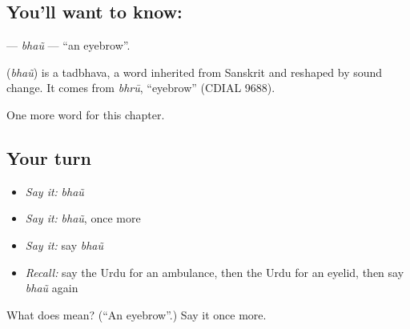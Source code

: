 \subsection*{You'll want to know: }
\textbf{} — \emph{bhaũ} — \textquotedblleft{}an eyebrow\textquotedblright{}.

\begin{cousinweb}
\textbf{} (\emph{bhaũ}) is a tadbhava, a word inherited from Sanskrit and reshaped by sound change. It comes from \emph{bhrū}, \textquotedblleft{}eyebrow\textquotedblright{} (CDIAL 9688).
\end{cousinweb}

\begin{grammarlens}[title={What you've built}]
One more word for this chapter.
\end{grammarlens}

\subsection*{Your turn}
\begin{itemize}
\raggedright
  \item \emph{Say it:} \emph{bhaũ}
  \item \emph{Say it:} \emph{bhaũ}, once more
  \item \emph{Say it:} say \emph{bhaũ}
  \item \emph{Recall:} say the Urdu for an ambulance, then the Urdu for an eyelid, then say \emph{bhaũ} again
\end{itemize}

\begin{tcolorbox}[breakable,colback=teal!4,colframe=teal!35!black,title={Before you move on}]
What does  mean? (\textquotedblleft{}An eyebrow\textquotedblright{}.) Say it once more.
\end{tcolorbox}
